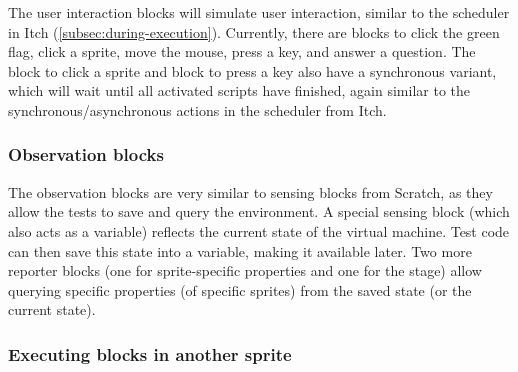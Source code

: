 \documentclass[../main]{subfiles}
\begin{document}
The user interaction blocks will simulate user interaction, similar to the scheduler in Itch (\cref{subsec:during-execution}).
Currently, there are blocks to click the green flag, click a sprite, move the mouse, press a key, and answer a question.
The block to click a sprite and block to press a key also have a synchronous variant, which will wait until all activated scripts have finished, again similar to the synchronous/asynchronous actions in the scheduler from Itch.

\subsubsection{Observation blocks}

\begin{varwidth}{0.5\linewidth}
\end{varwidth}%
\hspace{1em}%
\begin{varwidth}{0.5\linewidth}
\end{varwidth}%

The observation blocks are very similar to sensing blocks from Scratch, as they allow the tests to save and query the environment.
A special sensing block (which also acts as a variable) reflects the current state of the virtual machine.
Test code can then save this state into a variable, making it available later.
Two more reporter blocks (one for sprite-specific properties and one for the stage) allow querying specific properties (of specific sprites) from the saved state (or the current state).

\subsubsection{Executing blocks in another sprite}

\begin{varwidth}{0.5\linewidth}
    \begin{scratch}[scale=0.7]
    \end{scratch}
\end{varwidth}%
\hspace{1em}%
\begin{varwidth}{0.5\linewidth}
    \begin{scratch}[scale=0.7]
    \end{scratch}
\end{varwidth}%
\end{document}
